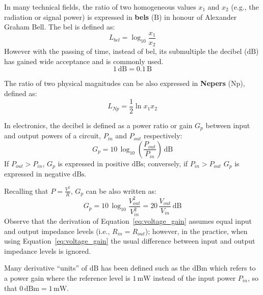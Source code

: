 In many technical fields, the ratio of two homogeneous values $x_1$ and $x_2$ (e.g., the radiation or signal power) is expressed in \textbf{bels} ($\textrm{B}$) in honour of Alexander Graham Bell. The bel is defined as:
\begin{equation}
L_{bel} = \log_{10}\frac{x_1}{x_2}
\end{equation} 
However with the passing of time, instead of bel, its submultiple the decibel ($\textrm{dB}$) has gained wide acceptance and is commonly used.
\[1\,\textrm{dB} = 0.1\,\textrm{B}\]
\begin{remark}
The ratio of two physical magnitudes can be also expressed in \textbf{\textrm{Nepers}} (\textrm{Np}), defined as:
\[L_{Np}=\frac{1}{2}\ln{x_1}{x_2}\]
\end{remark}
In electronics, the decibel is defined as a power ratio or gain $G_p$ between input and output powers of a circuit, $P_{in}$ and $P_{out}$ respectively:
\begin{equation}
G_p = 10\,\log_{10}\left(\frac{P_{out}}{P_{in}}\right)\,\textrm{dB}
\end{equation}
If $P_{out}>P_{in}$, $G_p$ is expressed in positive $\textrm{dBs}$; conversely, if $P_{in}>P_{out}$ $G_p$ is expressed in negative $\textrm{dBs}$.

Recalling that $P=\frac{V^2}{R}$, $G_p$ can be also written as:
\begin{equation}
\label{eq:voltage_gain}
G_p = 10\,\log_{10}\frac{V^2_{out}}{V^2_{in}} = 20\,\frac{V_{out}}{V_{in}}\,\textrm{dB}
\end{equation}
Observe that the derivation of Equation~\ref{eq:voltage_gain} assumes equal input and output impedance levels (i.e., $R_{in}=R_{out}$); however, in the practice, when using Equation~\ref{eq:voltage_gain} the usual difference between input and output impedance levels is ignored.

Many derivative ``units'' of $\textrm{dB}$  has been defined such as the $\textrm{dBm}$ which refers to a power gain where the reference level is $1\,\textrm{mW}$ instead of the input power $P_{in}$, so that $0\,\textrm{dBm}=1\,\textrm{mW}$.
